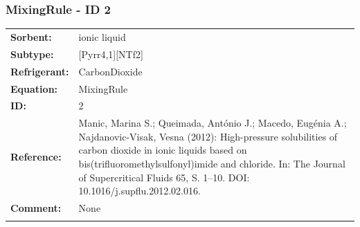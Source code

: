 \subsubsection{MixingRule - ID 2}
%
\begin{tabular}[l]{|lp{11.5cm}|}
\hline
\addlinespace

\textbf{Sorbent:} & ionic liquid \\
\textbf{Subtype:} & [Pyrr4,1][NTf2] \\
\textbf{Refrigerant:} & CarbonDioxide \\
\textbf{Equation:} & MixingRule \\
\textbf{ID:} & 2 \\
\textbf{Reference:} & Manic, Marina S.; Queimada, António J.; Macedo, Eugénia A.; Najdanovic-Visak, Vesna (2012): High-pressure solubilities of carbon dioxide in ionic liquids based on bis(trifluoromethylsulfonyl)imide and chloride. In: The Journal of Supercritical Fluids 65, S. 1–10. DOI: 10.1016/j.supflu.2012.02.016. \\
\textbf{Comment:} & None \\

\addlinespace
\hline
\end{tabular}
\newline


